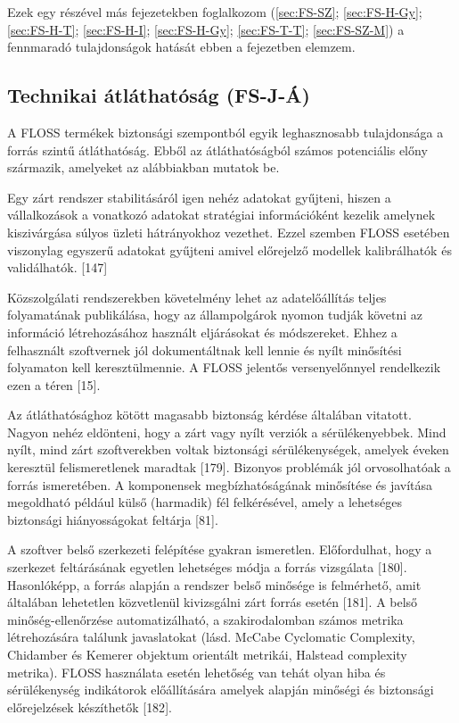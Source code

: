 \documentclass[12pt,magyar,a4paper,oneside]{scrreprt}
\begin{document}
Ezek egy részével más fejezetekben foglalkozom (\ref{sec:FS-SZ};
\ref{sec:FS-H-Gy}; \ref{sec:FS-H-T}; \ref{sec:FS-H-I};
\ref{sec:FS-H-Gy}; \ref{sec:FS-T-T}; \ref{sec:FS-SZ-M}) a fennmaradó
tulajdonságok hatását ebben a fejezetben elemzem.

\hypertarget{sec:FS-J-uxc1}{%
\subsection{Technikai átláthatóság (FS-J-Á)}\label{sec:FS-J-uxc1}}

A FLOSS termékek biztonsági szempontból egyik leghasznosabb tulajdonsága
a forrás szintű átláthatóság. Ebből az átláthatóságból számos
potenciális előny származik, amelyeket az alábbiakban mutatok be.

Egy zárt rendszer stabilitásáról igen nehéz adatokat gyűjteni, hiszen a
vállalkozások a vonatkozó adatokat stratégiai információként kezelik
amelynek kiszivárgása súlyos üzleti hátrányokhoz vezethet. Ezzel szemben
FLOSS esetében viszonylag egyszerű adatokat gyűjteni amivel előrejelző
modellek kalibrálhatók és validálhatók. {[}147{]}

Közszolgálati rendszerekben követelmény lehet az adatelőállítás teljes
folyamatának publikálása, hogy az állampolgárok nyomon tudják követni az
információ létrehozásához használt eljárásokat és módszereket. Ehhez a
felhasznált szoftvernek jól dokumentáltnak kell lennie és nyílt
minősítési folyamaton kell keresztülmennie. A FLOSS jelentős
versenyelőnnyel rendelkezik ezen a téren {[}15{]}.

Az átláthatósághoz kötött magasabb biztonság kérdése általában vitatott.
Nagyon nehéz eldönteni, hogy a zárt vagy nyílt verziók a
sérülékenyebbek. Mind nyílt, mind zárt szoftverekben voltak biztonsági
sérülékenységek, amelyek éveken keresztül felismeretlenek maradtak
{[}179{]}. Bizonyos problémák jól orvosolhatóak a forrás ismeretében. A
komponensek megbízhatóságának minősítése és javítása megoldható például
külső (harmadik) fél felkérésével, amely a lehetséges biztonsági
hiányosságokat feltárja {[}81{]}.

A szoftver belső szerkezeti felépítése gyakran ismeretlen. Előfordulhat,
hogy a szerkezet feltárásának egyetlen lehetséges módja a forrás
vizsgálata {[}180{]}. Hasonlóképp, a forrás alapján a rendszer belső
minősége is felmérhető, amit általában lehetetlen közvetlenül
kivizsgálni zárt forrás esetén {[}181{]}. A belső minőség-ellenőrzése
automatizálható, a szakirodalomban számos metrika létrehozására találunk
javaslatokat (lásd. McCabe Cyclomatic Complexity, Chidamber és Kemerer
objektum orientált metrikái, Halstead complexity metrika). FLOSS
használata esetén lehetőség van tehát olyan hiba és sérülékenység
indikátorok előállítására amelyek alapján minőségi és biztonsági
előrejelzések készíthetők {[}182{]}.
\end{document}
